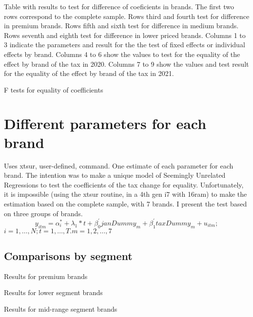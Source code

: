 \documentclass[]{article}
\begin{document}
Table with results to test for difference of coeficients in brands. The first two rows correspond to the complete sample. Rows third and fourth test for difference in premium brands. Rows fifth and sixth test for difference in medium brands. Rows seventh and eighth test for difference in lower priced brands.
Columns 1 to 3 indicate the parameters and result for the the test of fixed effects or individual effects by brand. Columns 4 to 6 show the values to test for the equality of the effect by brand of the tax in 2020. Columns 7 to 9 show the values and test result for the equality of the effect by brand of the tax in 2021.


\begin{landscape}
	\begin{table}[ht]
		\centering
		\caption{F tests for equality of coefficients \label{tab:F_areg}} 
	

	\end{table}
\end{landscape}


\section{Different parameters for each brand}
Uses xtsur, user-defined, command.
One estimate of each parameter for each brand. 
The intention was to make a unique model of Seemingly Unrelated Regressions to test the coefficients of the tax change for equality. 
Unfortunately, it is impossible (using the xtsur routine, in a 4th gen i7 with 16ram) to make the estimation based on the complete sample, with 7 brands. I present the test based on three groups of brands.
\begin{equation*} 
	y_{itm}  = \alpha_{i}^{*} + \lambda_{1}*t +\beta_{0}^{'}janDummy_{m} + \beta_{1}^{'}taxDummy_{m} + u_{itm}
	;  
\end{equation*}
$i  = 1,\ldots,N;  t=1,\ldots,T. m = 1,2,\ldots,7$

\subsection{Comparisons by segment}
Results for premium brands



Results for lower segment brands



Results for mid-range segment brands
\end{document}
